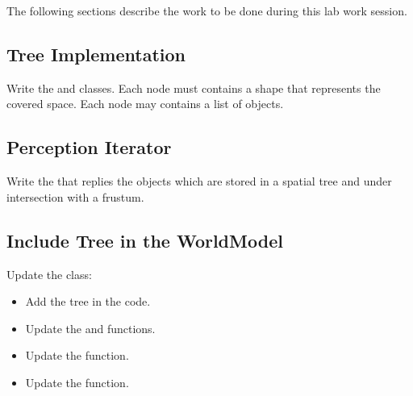 \documentclass[article,english,nodocumentinfo]{multiagentfrreport}
\begin{document}
The following sections describe the work to be done during this lab work session.

\subsection{Tree Implementation}

Write the  and  classes.
Each node must contains a shape that represents the covered space.
Each node may contains a list of objects.

\subsection{Perception Iterator}

Write the  that replies the objects which are stored in a spatial tree and under intersection with a frustum.

\subsection{Include Tree in the WorldModel}

Update the  class:
\begin{itemize}
\item Add the tree in the code.
\item Update the  and  functions.
\item Update the  function.
\item Update the  function.
\end{itemize}
\end{document}
